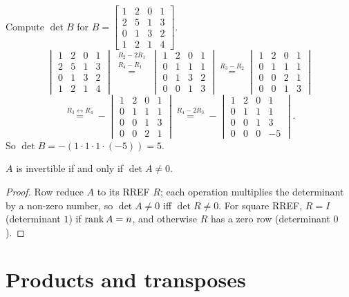 \begin{example}
Compute $\det B$ for $B=\begin{bmatrix}1&2&0&1\\2&5&1&3\\0&1&3&2\\1&2&1&4\end{bmatrix}$.
\[
\begin{vmatrix}1&2&0&1\\2&5&1&3\\0&1&3&2\\1&2&1&4\end{vmatrix}
\overset{\substack{R_2-2R_1\\R_4-R_1}}{=}
\begin{vmatrix}1&2&0&1\\0&1&1&1\\0&1&3&2\\0&0&1&3\end{vmatrix}
\overset{R_3-R_2}{=}
\begin{vmatrix}1&2&0&1\\0&1&1&1\\0&0&2&1\\0&0&1&3\end{vmatrix}
\]
\[
\overset{R_3\leftrightarrow R_4}{=}
-\begin{vmatrix}1&2&0&1\\0&1&1&1\\0&0&1&3\\0&0&2&1\end{vmatrix}
\overset{R_4-2R_3}{=}
-\begin{vmatrix}1&2&0&1\\0&1&1&1\\0&0&1&3\\0&0&0&-5\end{vmatrix}.
\]
So $\det B=-(1\cdot1\cdot1\cdot(-5))=5$.
\end{example}

\begin{theorem}
$A$ is invertible if and only if $\det A\ne0$.
\end{theorem}
\begin{proof}
Row reduce $A$ to its RREF $R$; each operation multiplies the determinant by a non-zero number, so
$\det A\neq0$ iff $\det R\ne0$. For square RREF, $R=I$ (determinant $1$) if $\operatorname{rank} A=n$, and otherwise $R$ has
a zero row (determinant $0$).
\end{proof}

\section{Products and transposes}

